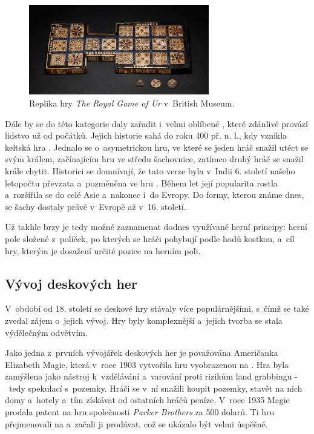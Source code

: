 \begin{figure}[h]
    \centering
    \includegraphics[width=0.7\textwidth]{figures/images/royal-game-of-ur-british-museum.jpg}
    \caption{Replika hry \textit{The Royal Game of Ur} v~British Museum. \cite{british_museum_2021}}
    \label{fig:royal_game_of_ur}
\end{figure}

Dále by se do této kategorie daly zařadit i~velmi oblíbené \textbf{}, které zdánlivě provází lidstvo už od počátků. Jejich historie sahá do roku 400 př. n. l., kdy vznikla keltská hra . Jednalo se o~asymetrickou hru, ve které se jeden hráč snažil utéct se svým králem, začínajícím hru ve středu šachovnice, zatímco druhý hráč se snažil krále chytit. Historici se domnívají, že tato verze byla v~Indii 6. století našeho letopočtu převzata a~pozměněna ve hru . Během let její popularita rostla a~rozšířila se do celé Asie a~nakonec i~do Evropy. Do formy, kterou známe dnes, se šachy dostaly právě v~Evropě až v~16. století. \cite{chess_com_2023}

Už takhle brzy je tedy možné zaznamenat dodnes využívané herní principy: herní pole složené z~políček, po kterých se hráči pohybují podle hodů kostkou, a~cíl hry, kterým je dosažení určité pozice na herním poli. \cite{attia_2018}

\subsection{Vývoj deskových her}
\label{subsec:development}

V~období od 18. století se deskové hry stávaly více populárnějšími, s~čímž se také zvedal zájem o~jejich vývoj. Hry byly komplexnější a~jejich tvorba se stala výdělečným odvětvím.

Jako jedna z~prvních vývojářek deskových her je považována Američanka Elizabeth Magie, která v~roce 1903 vytvořila hru  vyobrazenou na . Hra byla zamýšlena jako nástroj k~vzdělávání a~varování proti rizikům land grabbingu -~tedy spekulací s~pozemky. Hráči se v~ní snažili koupit pozemky, stavět na nich domy a~hotely a~tím získávat od ostatních hráčů peníze. V~roce 1935 Magie prodala patent na hru společnosti \textit{Parker Brothers} za 500 dolarů. Ti hru přejmenovali na \textbf{} a~začali ji prodávat, což se ukázalo být velmi úspěšné. \cite{attia_2018}

